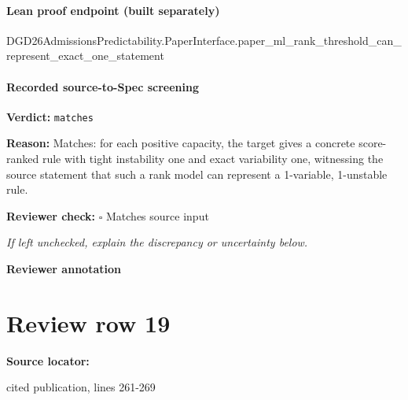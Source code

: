 \documentclass[10pt]{article}
\newcommand{\reviewerbox}{%
  \par\noindent\fbox{\parbox{0.96\linewidth}{\rule{0pt}{0.38in}}}\par
}
\newcommand{\reviewmatch}[1]{%
  \par\noindent\textbf{Reviewer check:} $\square$\; #1\par
  \noindent\emph{If left unchecked, explain the discrepancy or uncertainty below.}\par
}
\begin{document}
\paragraph{Lean proof endpoint (built separately)}\begin{ReviewVerbatim}
DGD26AdmissionsPredictability.PaperInterface.paper_ml_rank_threshold_can_represent_exact_one_statement
\end{ReviewVerbatim}

\paragraph{Recorded source-to-Spec screening}
\textbf{Verdict:} \texttt{matches}
\\
{\raggedright
\textbf{Reason:} Matches:\allowbreak{} for each positive capacity, the target gives a concrete score-\allowbreak{}ranked rule with tight instability one and exact variability one, witnessing the source statement that such a rank model can represent a 1-\allowbreak{}variable, 1-\allowbreak{}unstable rule.\allowbreak{}
\par}
\reviewmatch{Matches source input}
\noindent\textbf{Reviewer annotation}\par
\reviewerbox
\clearpage
\hypertarget{source-claim-47a9f492a25c4e98}{}
\section*{Review row 19}
\textbf{Source locator:} {\footnotesize\raggedright cited publication, lines 261-\allowbreak{}269\par}
\end{document}

